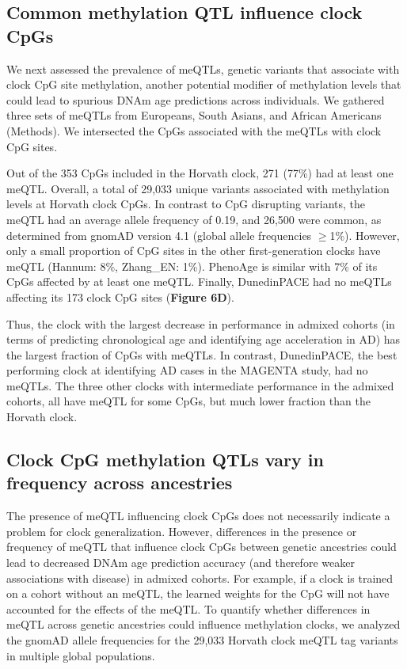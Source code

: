 \subsection{Common methylation QTL influence clock CpGs} 
We next assessed the prevalence of meQTLs, genetic variants that associate with clock CpG site methylation, another potential modifier of methylation levels that could lead to spurious DNAm age predictions across individuals. We gathered three sets of meQTLs from Europeans, South Asians, and African Americans (Methods). We intersected the CpGs associated with the meQTLs with clock CpG sites. 

Out of the 353 CpGs included in the Horvath clock, 271 (77\%) had at least one meQTL. Overall, a total of 29,033 unique variants associated with methylation levels at Horvath clock CpGs. In contrast to CpG disrupting variants, the meQTL had an average allele frequency of 0.19, and 26,500 were common, as determined from gnomAD version 4.1 (global allele frequencies $\geq$1\%). However, only a small proportion of CpG sites in the other first-generation clocks have meQTL (Hannum: 8\%, Zhang\_EN: 1\%). PhenoAge is similar with 7\% of its CpGs affected by at least one meQTL. Finally, DunedinPACE had no meQTLs affecting its 173 clock CpG sites (\textbf{Figure 6D}).

Thus, the clock with the largest decrease in performance in admixed cohorts (in terms of predicting chronological age and identifying age acceleration in AD) has the largest fraction of CpGs with meQTLs. In contrast, DunedinPACE, the best performing clock at identifying AD cases in the MAGENTA study, had no meQTLs. The three other clocks with intermediate performance in the admixed cohorts, all have meQTL for some CpGs, but much lower fraction than the Horvath clock.

\subsection{Clock CpG methylation QTLs vary in frequency across ancestries}
The presence of meQTL influencing clock CpGs does not necessarily indicate a problem for clock generalization. However, differences in the presence or frequency of meQTL that influence clock CpGs between genetic ancestries could lead to decreased DNAm age prediction accuracy (and therefore weaker associations with disease) in admixed cohorts. For example, if a clock is trained on a cohort without an meQTL, the learned weights for the CpG will not have accounted for the effects of the meQTL. To quantify whether differences in meQTL across genetic ancestries could influence methylation clocks, we analyzed the gnomAD allele frequencies for the 29,033 Horvath clock meQTL tag variants in multiple global populations. 

